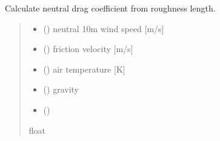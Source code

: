 \documentclass[letterpaper,10pt,english]{sphinxmanual}
\begin{document}

\begin{fulllineitems}
\label{\detokenize{users_guide:flux_subs.cdn_from_roughness}}
\pysigstartsignatures
{}
\pysigstopsignatures
\sphinxAtStartPar
Calculate neutral drag coefficient from roughness length.
\begin{quote}\begin{description}
\begin{itemize}
\item {} 
\sphinxAtStartPar
{} () \textendash{} neutral 10m wind speed {[}m/s{]}

\item {} 
\sphinxAtStartPar
{} () \textendash{} friction velocity      {[}m/s{]}

\item {} 
\sphinxAtStartPar
{} () \textendash{} air temperature        {[}K{]}

\item {} 
\sphinxAtStartPar
{} (\sphinxstyleliteralemphasis{\sphinxupquote{                {[}}}\sphinxstyleliteralemphasis{\sphinxupquote{{]}}}) \textendash{} gravity

\item {} 
\sphinxAtStartPar
{} () \textendash{} 

\end{itemize}

\sphinxAtStartPar
{}

\sphinxAtStartPar
float

\end{description}\end{quote}

\end{fulllineitems}
\end{document}
